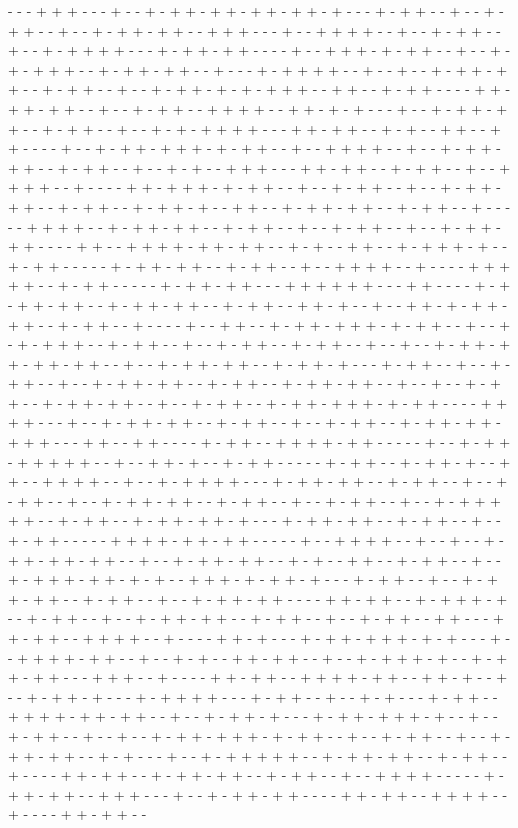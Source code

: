 - - - + + + - - - + - - + - + + - + + - + + - + + - + - - - + - + + - - + - - + - + + - - + - - + - + + - + + - - + + + - - - + - - + + + + - - + - - + - + + - - + - - + - + + + + - - - + - + + - + + - - - - + - - + + + - + - + + - - + - - + - + - + + + - - + - + + - + + - - + - - - + - + + + + - - + - - + - - + - + + - + + - - + - + + - - + - - + - + + - + - + - + + + - - + + - - + - + + - - - - + + - + + - + + - - + - - + - + + - - + + + + - - + + - + - + - - - + - - + - + + - + + - - + - + + - - + - - + - + - + + + + - - - + + - + + - - + - + - - + + - - + + - - - - + - - + - + + - + + + - + - + + - - + - - + + + + - - + - - + - + + - + + - - + - + + - - + - - + - + - - + + + - - - + + - + + - - + - + + - - + - - + + + + - - + - - - - + + - + + + - + - + + - - + - - + - + + - - + - - + - + + - + + - - + - + + - - + - + + - + - - + + - - + - + + - + + - - + - + + - - + - - - - - + + + + - - + - + + - + + - - + - + + - - + - - + - + + - - + - - + - + + - + + - - - - + + - - + + + + - + + - + + - - + - + - - + + - - + - + + + - + - - + - + + - - - - - + - + + - + + - - + - + + - - + - - + + + + - - + - - - - + + + + + - - + - + + - - - - - + - + + - + + - - - + + + + + + - - - + + - - - - + - + - + + - + + - - + - + + - + + - - + - + + - - + + - + - - + - - + + - + - + + - + + - - + - + + - - + - - - - + - - + + - - + - + + - + + + - + - + + - - + - - + - + - + + + - - + - + + - - + - - + - + + - - + - + + - - + - - + - - + - + + - + + - + + - + + - - + - - + - + + - + + - - + - + + - + - - - + - + + - - + - - + - + + - - + - - + - + + - + + - - + - + + - - + - + + - + + - - + - - + - - + - + + - - + - + + - + + - - + - - + - + + - - + - + + - + + + - + - + + - - - - + + + + - - - + - - + - + + - + + - - + - + + - - + - - + - + + - - + - + + - + + - + + + - - - + + - - + + - - - - + - + + - - + + + + - + + - - - - - + - - + - + + - + + + + + - - + - - + + - + - - + - + + - - - - - + - + + - - + - + + - + - - + + - - + + + + - - + - - + - + + + + - - - + - + + - + + - - + - + + - - + - - + - + + - - + - - + - + + - + + - - + - + + - - + - - + - + + - - + - - + - + + + + + - - + - + + - - + - + + - + + - + - - - + - + + - + + - - + - + + - - + - - + - + + - - - - - + + + + - + + - + + - - - - - + - - + + + + - - + - - + - - + - + + - + + - + + - - + - - + - + + - + + - - + - + - - + + - - + - + + - - + - - + - + + + - + + - + - + - - + + + - + - + + - + - - - + - + + - - + - - + - + + - + + - - + - + + - - + - - + - + + - + + - - - - + + - + + - - + - + + + - + - - + - + + - - + - - + - + + - + + - - + - + + - - + - - + - + + - - + + - - - + + - + + - - + + + + - - + - - - - + + - + - - - + - + + - + + + - + - + - - - + - - + + + + - + + - - + - - + - + - - + + - + + - - + - - + - + + + - + - - + - + + - + + - - - + + + - - + - - - - + + - + + - - + + + + - + + - - + + - + - - + - - + - + + - + - - - + - + + + + - - - + - + + - - + - - + - + - - - + - + + - - + + + + - + + - + + - - + - - + - + + - + - - - + - + + - + + + - + - - + - - + - + + - - + - - + - - + - + + - + + + - + - + + - - + - - + - + + - - + - - + - + + - + + - - + - + - - - + - - + - + + + + + - - + - + + - + + - - + - + + - - + - - - - + + - + + - - + - + + - + + - - + - + + - - + - - + + + + - - - - - + - + + - + + - - + + + - - - + - - + - + + - + + - - - - + + - + + - - + + + + - - + - - - - + + - + + - - 